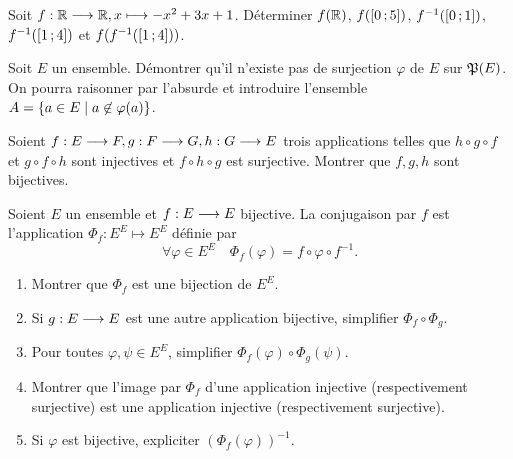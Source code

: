 \begin{exercice}
    Soit \(f:\mathbb{R} \longrightarrow \mathbb{R}, x \longmapsto -x^2+3x+1\). Déterminer \(f(\mathbb{R})\), 
    \(f(\left[ 0 \, ;  5 \right])\), \(f^{-1}(\left[ 0 \, ;  1 \right])\), 
    \(f^{-1}(\left[ 1 \, ;  4 \right])\) et \(f(f^{-1}(\left[ 1 \, ;  4 \right]))\).
\end{exercice}

\begin{exercice}
    Soit \(E\) un ensemble. Démontrer qu'il n'existe pas de surjection 
    \(\varphi\) de \(E\) sur \(\mathfrak{P}(E)\). On pourra raisonner par l'absurde et 
    introduire l'ensemble \(A=\left\{a \in E\mathrel{}\middle|\mathrel{}a \not\in \varphi(a)\right\}\).
\end{exercice}

\begin{exercice}
    Soient \(f:E \longrightarrow F, g:F \longrightarrow G, h:G \longrightarrow E\) 
    trois applications telles que \(h \circ g \circ f\) et \(g \circ f \circ h\) 
    sont injectives et \(f \circ h \circ g\) est surjective. Montrer que \(f, g, 
    h\) sont bijectives.
\end{exercice}

\begin{exercice}[Conjugaison]
    Soient \(E\) un ensemble et \(f:E \longrightarrow E\) bijective. La 
    conjugaison par \(f\) est l'application \(\Phi_f : E^E \longmapsto E^E\) 
    définie par
    \begin{equation}
        \forall \varphi \in E^E \quad \Phi_f(\varphi) = f \circ \varphi \circ 
        f^{-1}.
    \end{equation}
    \begin{enumerate}
        \item Montrer que \(\Phi_f\) est une bijection de \(E^E\).
        \item Si \(g:E \longrightarrow E\) est une autre application bijective, 
            simplifier \(\Phi_f \circ \Phi_g\).
        \item Pour toutes \(\varphi, \psi \in E^E\), simplifier  
            \(\Phi_f(\varphi) \circ \Phi_g(\psi)\).
        \item Montrer que l'image par \(\Phi_f\) d'une application injective 
            (respectivement surjective) est une application injective 
            (respectivement surjective).
        \item Si \(\varphi\) est bijective, expliciter 
            \((\Phi_f(\varphi))^{-1}\).
    \end{enumerate}
\end{exercice}

